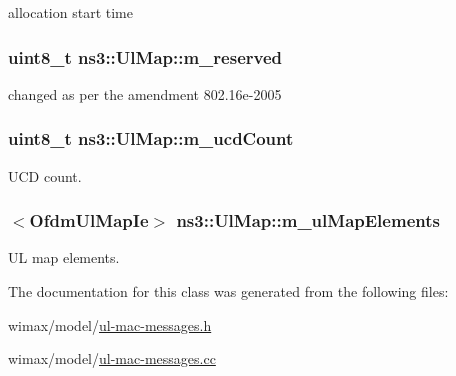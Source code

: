 allocation start time 

\subsubsection[{\texorpdfstring{m\+\_\+reserved}{m_reserved}}]{\setlength{\rightskip}{0pt plus 5cm}uint8\+\_\+t ns3\+::\+Ul\+Map\+::m\+\_\+reserved\hspace{0.3cm}{\ttfamily [private]}}\hypertarget{classns3_1_1UlMap_a5ac6702cabf1acf23fb0556f7d0221fd}{}\label{classns3_1_1UlMap_a5ac6702cabf1acf23fb0556f7d0221fd}


changed as per the amendment 802.\+16e-\/2005 

\subsubsection[{\texorpdfstring{m\+\_\+ucd\+Count}{m_ucdCount}}]{\setlength{\rightskip}{0pt plus 5cm}uint8\+\_\+t ns3\+::\+Ul\+Map\+::m\+\_\+ucd\+Count\hspace{0.3cm}{\ttfamily [private]}}\hypertarget{classns3_1_1UlMap_a3bb89d3859c1574887aa8df71630e832}{}\label{classns3_1_1UlMap_a3bb89d3859c1574887aa8df71630e832}


U\+CD count. 

\subsubsection[{\texorpdfstring{m\+\_\+ul\+Map\+Elements}{m_ulMapElements}}]{$<${\bf Ofdm\+Ul\+Map\+Ie}$>$ ns3\+::\+Ul\+Map\+::m\+\_\+ul\+Map\+Elements\hspace{0.3cm}{\ttfamily [private]}}\hypertarget{classns3_1_1UlMap_ad3c135ad9afb96b612ec44d6b47c54de}{}\label{classns3_1_1UlMap_ad3c135ad9afb96b612ec44d6b47c54de}


UL map elements. 



The documentation for this class was generated from the following files\+:\begin{DoxyCompactItemize}
\item 
wimax/model/\hyperlink{ul-mac-messages_8h}{ul-\/mac-\/messages.\+h}\item 
wimax/model/\hyperlink{ul-mac-messages_8cc}{ul-\/mac-\/messages.\+cc}\end{DoxyCompactItemize}
